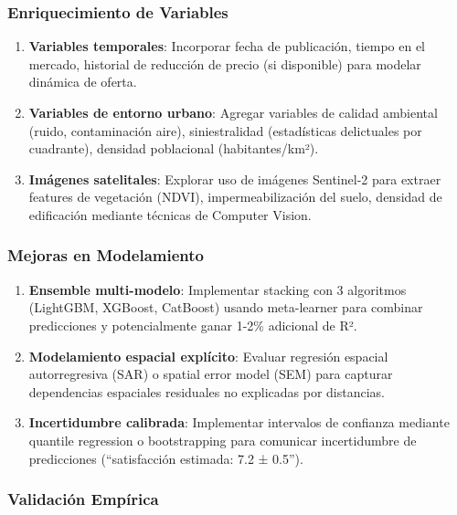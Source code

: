 \subsubsection{Enriquecimiento de Variables}

\begin{enumerate}
    \item \textbf{Variables temporales}: Incorporar fecha de publicación, tiempo en el mercado, historial de reducción de precio (si disponible) para modelar dinámica de oferta.
    
    \item \textbf{Variables de entorno urbano}: Agregar variables de calidad ambiental (ruido, contaminación aire), siniestralidad (estadísticas delictuales por cuadrante), densidad poblacional (habitantes/km²).
    
    \item \textbf{Imágenes satelitales}: Explorar uso de imágenes Sentinel-2 para extraer features de vegetación (NDVI), impermeabilización del suelo, densidad de edificación mediante técnicas de Computer Vision.
\end{enumerate}

\subsubsection{Mejoras en Modelamiento}

\begin{enumerate}
    \item \textbf{Ensemble multi-modelo}: Implementar stacking con 3 algoritmos (LightGBM, XGBoost, CatBoost) usando meta-learner para combinar predicciones y potencialmente ganar 1-2\% adicional de R².
    
    \item \textbf{Modelamiento espacial explícito}: Evaluar regresión espacial autorregresiva (SAR) o spatial error model (SEM) para capturar dependencias espaciales residuales no explicadas por distancias.
    
    \item \textbf{Incertidumbre calibrada}: Implementar intervalos de confianza mediante quantile regression o bootstrapping para comunicar incertidumbre de predicciones (``satisfacción estimada: 7.2 ± 0.5'').
\end{enumerate}

\subsubsection{Validación Empírica}

